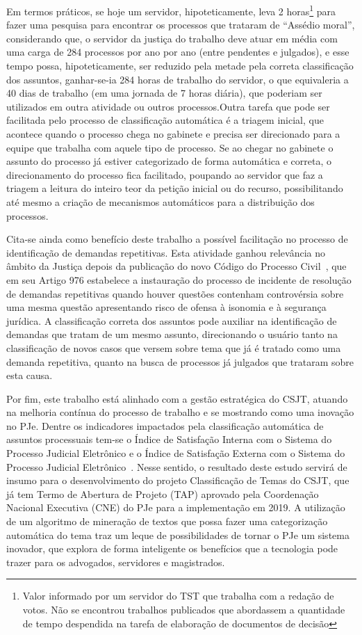 Em termos práticos, se hoje um servidor, hipoteticamente, leva 2 horas\footnote{Valor informado por um servidor do TST que trabalha com a redação de votos. Não se encontrou trabalhos publicados que abordassem a quantidade de tempo despendida na tarefa de elaboração de documentos de decisão} para fazer uma pesquisa para encontrar os processos que trataram de “Assédio moral”, considerando que, o servidor da justiça do trabalho deve atuar em média com uma carga de 284 processos por ano por ano (entre pendentes e julgados)\cite{justicaemnumeros2017}, e esse tempo possa, hipoteticamente, ser reduzido pela metade pela correta classificação dos assuntos, ganhar-se-ia 284 horas de trabalho do servidor, o que equivaleria a 40 dias de trabalho (em uma jornada de 7 horas diária), que poderiam ser utilizados em outra atividade ou outros processos.Outra tarefa que pode ser facilitada pelo processo de classificação automática é a triagem inicial, que acontece quando o processo chega no gabinete e precisa ser direcionado para a equipe que trabalha com aquele tipo de processo. Se ao chegar no gabinete o assunto do processo já estiver categorizado de forma automática e correta, o direcionamento do processo fica facilitado, poupando ao servidor que faz a triagem a leitura do inteiro teor da petição inicial ou do recurso, possibilitando até mesmo a criação de mecanismos automáticos para a distribuição dos processos. 

Cita-se ainda como benefício deste trabalho a possível facilitação no processo de identificação de demandas repetitivas. Esta atividade ganhou relevância no âmbito da Justiça depois da publicação do novo Código do Processo Civil~\cite{novocpc}, que em seu Artigo 976 estabelece a instauração do processo de incidente de resolução de demandas repetitivas quando houver questões contenham controvérsia sobre uma mesma questão apresentando risco de ofensa à isonomia  e à segurança jurídica. A classificação correta dos assuntos pode auxiliar na identificação de demandas que tratam de um mesmo assunto, direcionando o usuário tanto na classificação de novos casos que versem sobre tema que já é tratado como uma demanda repetitiva, quanto na busca de processos já julgados que trataram sobre esta causa.


Por fim, este trabalho está alinhado com a gestão estratégica do CSJT, atuando na melhoria contínua do processo de trabalho e se mostrando como uma inovação no PJe. Dentre os indicadores impactados pela classificação automática de assuntos processuais tem-se o Índice de Satisfação Interna com o Sistema do Processo Judicial Eletrônico e o Índice de Satisfação Externa com o Sistema do Processo Judicial Eletrônico~\cite{conselho_superior_da_justica_do_trabalho_glossario_2017}. Nesse sentido, o resultado deste estudo servirá de insumo para o desenvolvimento do projeto Classificação de Temas do CSJT, que já tem Termo de Abertura de Projeto (TAP) aprovado pela Coordenação Nacional Executiva (CNE) do PJe para a implementação em 2019. 
A utilização de um algoritmo de mineração de textos que possa fazer uma categorização automática do tema traz um leque de possibilidades de tornar o PJe  um sistema inovador, que explora de forma inteligente os benefícios que a tecnologia pode trazer para os advogados, servidores e magistrados. 


